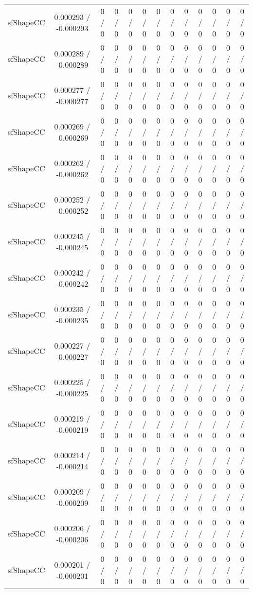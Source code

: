 \documentclass[10pt]{article}
\begin{document}
\begin{table}[htbp]
\begin{center}
\begin{tabular}{|c|c|c|c|c|c|c|c|c|c|c|c|c|}
  sfShapeCC & 0.000293 / -0.000293 & 0 / 0 & 0 / 0 & 0 / 0 & 0 / 0 & 0 / 0 & 0 / 0 & 0 / 0 & 0 / 0 & 0 / 0 & 0 / 0 & 0 / 0 \\ 
  sfShapeCC & 0.000289 / -0.000289 & 0 / 0 & 0 / 0 & 0 / 0 & 0 / 0 & 0 / 0 & 0 / 0 & 0 / 0 & 0 / 0 & 0 / 0 & 0 / 0 & 0 / 0 \\ 
  sfShapeCC & 0.000277 / -0.000277 & 0 / 0 & 0 / 0 & 0 / 0 & 0 / 0 & 0 / 0 & 0 / 0 & 0 / 0 & 0 / 0 & 0 / 0 & 0 / 0 & 0 / 0 \\ 
  sfShapeCC & 0.000269 / -0.000269 & 0 / 0 & 0 / 0 & 0 / 0 & 0 / 0 & 0 / 0 & 0 / 0 & 0 / 0 & 0 / 0 & 0 / 0 & 0 / 0 & 0 / 0 \\ 
  sfShapeCC & 0.000262 / -0.000262 & 0 / 0 & 0 / 0 & 0 / 0 & 0 / 0 & 0 / 0 & 0 / 0 & 0 / 0 & 0 / 0 & 0 / 0 & 0 / 0 & 0 / 0 \\ 
  sfShapeCC & 0.000252 / -0.000252 & 0 / 0 & 0 / 0 & 0 / 0 & 0 / 0 & 0 / 0 & 0 / 0 & 0 / 0 & 0 / 0 & 0 / 0 & 0 / 0 & 0 / 0 \\ 
  sfShapeCC & 0.000245 / -0.000245 & 0 / 0 & 0 / 0 & 0 / 0 & 0 / 0 & 0 / 0 & 0 / 0 & 0 / 0 & 0 / 0 & 0 / 0 & 0 / 0 & 0 / 0 \\ 
  sfShapeCC & 0.000242 / -0.000242 & 0 / 0 & 0 / 0 & 0 / 0 & 0 / 0 & 0 / 0 & 0 / 0 & 0 / 0 & 0 / 0 & 0 / 0 & 0 / 0 & 0 / 0 \\ 
  sfShapeCC & 0.000235 / -0.000235 & 0 / 0 & 0 / 0 & 0 / 0 & 0 / 0 & 0 / 0 & 0 / 0 & 0 / 0 & 0 / 0 & 0 / 0 & 0 / 0 & 0 / 0 \\ 
  sfShapeCC & 0.000227 / -0.000227 & 0 / 0 & 0 / 0 & 0 / 0 & 0 / 0 & 0 / 0 & 0 / 0 & 0 / 0 & 0 / 0 & 0 / 0 & 0 / 0 & 0 / 0 \\ 
  sfShapeCC & 0.000225 / -0.000225 & 0 / 0 & 0 / 0 & 0 / 0 & 0 / 0 & 0 / 0 & 0 / 0 & 0 / 0 & 0 / 0 & 0 / 0 & 0 / 0 & 0 / 0 \\ 
  sfShapeCC & 0.000219 / -0.000219 & 0 / 0 & 0 / 0 & 0 / 0 & 0 / 0 & 0 / 0 & 0 / 0 & 0 / 0 & 0 / 0 & 0 / 0 & 0 / 0 & 0 / 0 \\ 
  sfShapeCC & 0.000214 / -0.000214 & 0 / 0 & 0 / 0 & 0 / 0 & 0 / 0 & 0 / 0 & 0 / 0 & 0 / 0 & 0 / 0 & 0 / 0 & 0 / 0 & 0 / 0 \\ 
  sfShapeCC & 0.000209 / -0.000209 & 0 / 0 & 0 / 0 & 0 / 0 & 0 / 0 & 0 / 0 & 0 / 0 & 0 / 0 & 0 / 0 & 0 / 0 & 0 / 0 & 0 / 0 \\ 
  sfShapeCC & 0.000206 / -0.000206 & 0 / 0 & 0 / 0 & 0 / 0 & 0 / 0 & 0 / 0 & 0 / 0 & 0 / 0 & 0 / 0 & 0 / 0 & 0 / 0 & 0 / 0 \\ 
  sfShapeCC & 0.000201 / -0.000201 & 0 / 0 & 0 / 0 & 0 / 0 & 0 / 0 & 0 / 0 & 0 / 0 & 0 / 0 & 0 / 0 & 0 / 0 & 0 / 0 & 0 / 0 \\ 

\end{tabular}
\end{center}
\end{table}
\end{document}
